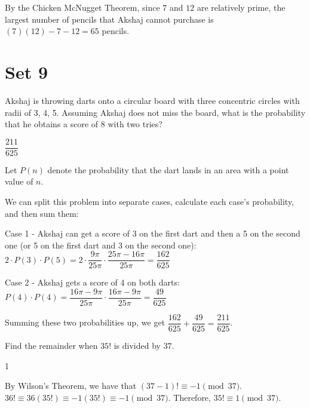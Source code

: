 \documentclass[11pt]{article}
\begin{document}
\begin{solution}
By the Chicken McNugget Theorem, since $7$ and $12$ are relatively prime, the largest number of pencils that Akshaj cannot purchase is $(7)(12)-7-12 = 65$ pencils.
\end{solution} 

\newpage

\section*{Set 9}

\begin{problem}
Akshaj is throwing darts onto a circular board with three concentric circles with radii of 3, 4, 5. Assuming Akshaj does not miss the board, what is the probability that he obtains a score of 8 with two tries? 
\end{problem}

\begin{answer}
$\dfrac{211}{625}$
\end{answer}

\begin{solution}
Let $P(n)$ denote the probability that the dart lands in an area with a point value of $n$.

We can split this problem into separate cases, calculate each case's probability, and then sum them:

Case 1 - Akshaj can get a score of 3 on the first dart and then a 5 on the second one (or 5 on the first dart and 3 on the second one): $2 \cdot P(3) \cdot P(5) = 2 \cdot \dfrac{9\pi}{25\pi} \cdot \dfrac{25\pi-16\pi}{25\pi} = \dfrac{162}{625}$

Case 2 - Akshaj gets a score of 4 on both darts: $ P(4) \cdot P(4) = \dfrac{16\pi-9\pi}{25\pi} \cdot  \dfrac{16\pi-9\pi}{25\pi} = \dfrac{49}{625}$

Summing these two probabilities up, we get $\dfrac{162}{625} + \dfrac{49}{625} = \dfrac{211}{625}$.
\end{solution}


\begin{problem}
Find the remainder when $35!$ is divided by $37$.
\end{problem}

\begin{answer}
1
\end{answer}

\begin{solution}
By Wilson's Theorem, we have that $(37-1)! \equiv -1 \pmod{37}$. $36! \equiv 36(35!) \equiv -1(35!) \equiv -1 \pmod{37}$. Therefore, $35! \equiv 1 \pmod{37}$.
\end{solution}
\end{document}
